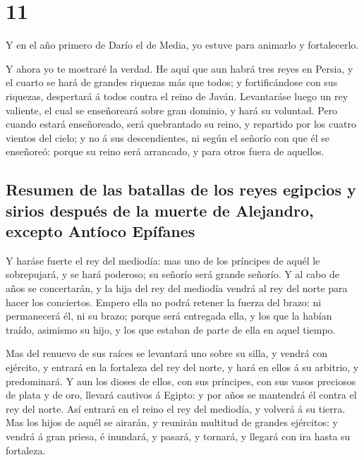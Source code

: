 \hypertarget{section-10}{%
\section{11}\label{section-10}}

 Y en el año primero de Darío el de Media, yo estuve para
animarlo y fortalecerlo.

 Y ahora yo te mostraré la verdad. He aquí que aun habrá
tres reyes en Persia, y el cuarto se hará de grandes riquezas más que
todos; y fortificándose con sus riquezas, despertará á todos contra el
reino de Javán.  Levantaráse luego un rey valiente, el cual
se enseñoreará sobre gran dominio, y hará su voluntad.  Pero
cuando estará enseñoreado, será quebrantado su reino, y repartido por
los cuatro vientos del cielo; y no á sus descendientes, ni según el
señorío con que él se enseñoreó: porque su reino será arrancado, y para
otros fuera de aquellos.

\hypertarget{resumen-de-las-batallas-de-los-reyes-egipcios-y-sirios-despuuxe9s-de-la-muerte-de-alejandro-excepto-antuxedoco-epuxedfanes}{%
\subsection{Resumen de las batallas de los reyes egipcios y sirios
después de la muerte de Alejandro, excepto Antíoco
Epífanes}\label{resumen-de-las-batallas-de-los-reyes-egipcios-y-sirios-despuuxe9s-de-la-muerte-de-alejandro-excepto-antuxedoco-epuxedfanes}}

 Y haráse fuerte el rey del mediodía: mas uno de los
príncipes de aquél le sobrepujará, y se hará poderoso; su señorío será
grande señorío.  Y al cabo de años se concertarán, y la hija
del rey del mediodía vendrá al rey del norte para hacer los conciertos.
Empero ella no podrá retener la fuerza del brazo: ni permanecerá él, ni
su brazo; porque será entregada ella, y los que la habían traído,
asimismo su hijo, y los que estaban de parte de ella en aquel tiempo.

 Mas del renuevo de sus raíces se levantará uno sobre su
silla, y vendrá con ejército, y entrará en la fortaleza del rey del
norte, y hará en ellos á su arbitrio, y predominará.  Y aun
los dioses de ellos, con sus príncipes, con sus vasos preciosos de plata
y de oro, llevará cautivos á Egipto: y por años se mantendrá él contra
el rey del norte.  Así entrará en el reino el rey del
mediodía, y volverá á su tierra.  Mas los hijos de aquél se
airarán, y reunirán multitud de grandes ejércitos: y vendrá á gran
priesa, é inundará, y pasará, y tornará, y llegará con ira hasta su
fortaleza.

